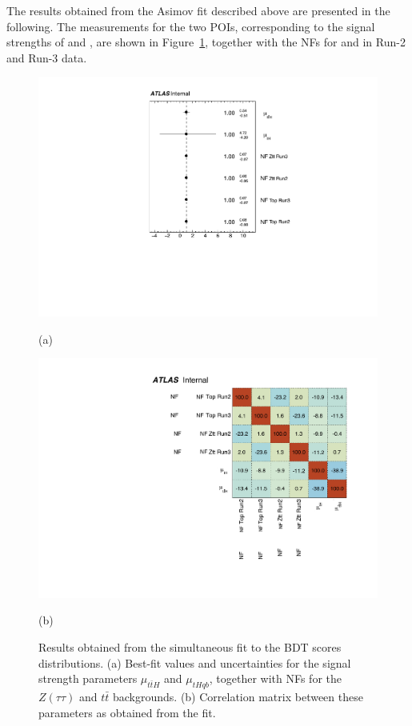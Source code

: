 The results obtained from the Asimov fit described above are presented in the following. The measurements for the two POIs, corresponding to the signal strengths of \thqb and \ttH, are shown in Figure~\ref{fig:nfs_th_tth}, together with the NFs for \ztautau and \ttbar in Run-2 and Run-3 data.
\begin{figure}[htbp]
  \centering
  \begin{minipage}[t]{0.495\textwidth}
    \centering
    \vspace{0pt}
    \includegraphics[width=\linewidth]{images/asimov_fit_th_tth/NormFactors.pdf}
    \caption*{(a)}
  \end{minipage}%
  \hfill
  \begin{minipage}[t]{0.495\textwidth}
    \centering
    \vspace{0pt}
    \includegraphics[width=\linewidth]{images/asimov_fit_th_tth/CorrMatrix.pdf}
    \caption*{(b)}
  \end{minipage}

  \caption{Results obtained from the simultaneous fit to the BDT scores distributions. 
  (a) Best-fit values and uncertainties for the signal strength parameters $\mu_{t\bar{t}H}$ and $\mu_{tHqb}$, 
  together with NFs for the $Z(\tau\tau)$ and $t\bar{t}$ backgrounds. 
  (b) Correlation matrix between these parameters as obtained from the fit.}
  \label{fig:nfs_th_tth}
\end{figure}

